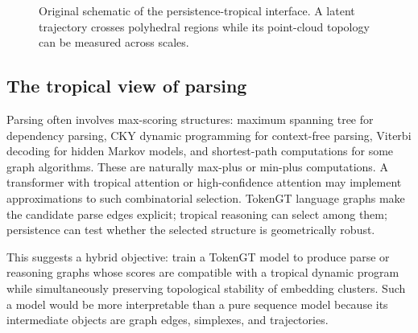 \documentclass[11pt]{article}
\newcommand{\1}{\mathbf{1}}
\begin{document}
\begin{figure}[H]
\centering
{}
\caption{Original schematic of the persistence-tropical interface. A latent trajectory crosses polyhedral regions while its point-cloud topology can be measured across scales.}
\label{fig:tropical_persistence}
\end{figure}

\subsection{The tropical view of parsing}

Parsing often involves max-scoring structures: maximum spanning tree for dependency parsing, CKY dynamic programming for context-free parsing, Viterbi decoding for hidden Markov models, and shortest-path computations for some graph algorithms. These are naturally max-plus or min-plus computations. A transformer with tropical attention or high-confidence attention may implement approximations to such combinatorial selection. TokenGT language graphs make the candidate parse edges explicit; tropical reasoning can select among them; persistence can test whether the selected structure is geometrically robust.

This suggests a hybrid objective: train a TokenGT model to produce parse or reasoning graphs whose scores are compatible with a tropical dynamic program while simultaneously preserving topological stability of embedding clusters. Such a model would be more interpretable than a pure sequence model because its intermediate objects are graph edges, simplexes, and trajectories.
\end{document}
